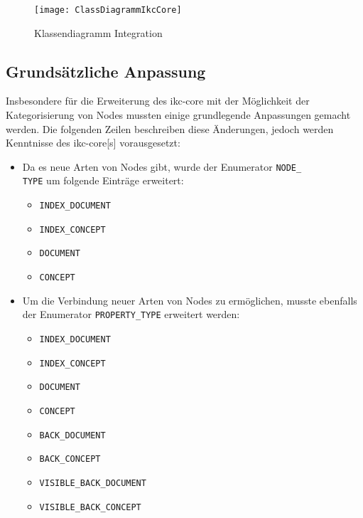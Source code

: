     \begin{figure}[H]
    \centering
    \texttt{[image: ClassDiagrammIkcCore]}
    \caption{Klassendiagramm Integration}
    \label{fig:classDiagrammIkcCore}
    \end{figure}



\subsection{Grundsätzliche Anpassung}


Insbesondere für die Erweiterung des \gls{ikc-core} mit der Möglichkeit der Kategorisierung von Nodes mussten einige grundlegende Anpassungen gemacht werden. Die folgenden Zeilen beschreiben diese Änderungen, jedoch werden Kenntnisse des \gls{ikc-core}[s] vorausgesetzt:
\begin{itemize}
    \item Da es neue Arten von Nodes gibt, wurde der Enumerator \verb|NODE_|\\\verb|TYPE| um folgende Einträge erweitert:
    \begin{itemize}
        \item \verb|INDEX_DOCUMENT|\\
        \item \verb|INDEX_CONCEPT|\\
        \item \verb|DOCUMENT|\\
        \item \verb|CONCEPT|\\
    \end{itemize}
    \item Um die Verbindung neuer Arten von Nodes zu  ermöglichen, musste ebenfalls der Enumerator \verb|PROPERTY_TYPE| erweitert werden:
    \begin{itemize}
        \item \verb|INDEX_DOCUMENT|\\
        \item \verb|INDEX_CONCEPT|\\
        \item \verb|DOCUMENT|\\
        \item \verb|CONCEPT|\\
        \item \verb|BACK_DOCUMENT|\\
        \item \verb|BACK_CONCEPT|\\
        \item \verb|VISIBLE_BACK_DOCUMENT|\\
        \item \verb|VISIBLE_BACK_CONCEPT|\\
    \end{itemize}    
\end{itemize}


